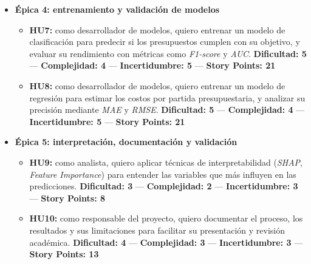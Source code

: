 \documentclass[
11pt, %
]{charter}
\begin{document}
\begin{itemize}
\begin{itemize}
      \item \textbf{HU6:} como científico de datos, quiero normalizar y codificar las variables categóricas y numéricas para que puedan ser interpretadas por los modelos.  
      \newline \textbf{Dificultad: 4} — \textbf{Complejidad: 3} — \textbf{Incertidumbre: 4} — \textbf{Story Points: 13}
    \end{itemize}

  \item \textbf{Épica 4: entrenamiento y validación de modelos}
    \begin{itemize}
      \item \textbf{HU7:} como desarrollador de modelos, quiero entrenar un modelo de clasificación para predecir si los presupuestos cumplen con su objetivo, y evaluar su rendimiento con métricas como \textit{F1-score} y \textit{AUC}.  
      \newline \textbf{Dificultad: 5} — \textbf{Complejidad: 4} — \textbf{Incertidumbre: 5} — \textbf{Story Points: 21}

      \item \textbf{HU8:} como desarrollador de modelos, quiero entrenar un modelo de regresión para estimar los costos por partida presupuestaria, y analizar su precisión mediante \textit{MAE} y \textit{RMSE}.  
      \newline \textbf{Dificultad: 5} — \textbf{Complejidad: 4} — \textbf{Incertidumbre: 5} — \textbf{Story Points: 21}
    \end{itemize}

  \item \textbf{Épica 5: interpretación, documentación y validación}
    \begin{itemize}
      \item \textbf{HU9:} como analista, quiero aplicar técnicas de interpretabilidad (\textit{SHAP}, \textit{Feature Importance}) para entender las variables que más influyen en las predicciones.  
      \newline \textbf{Dificultad: 3} — \textbf{Complejidad: 2} — \textbf{Incertidumbre: 3} — \textbf{Story Points: 8}

      \item \textbf{HU10:} como responsable del proyecto, quiero documentar el proceso, los resultados y sus limitaciones para facilitar su presentación y revisión académica.  
      \newline \textbf{Dificultad: 4} — \textbf{Complejidad: 3} — \textbf{Incertidumbre: 3} — \textbf{Story Points: 13}
    \end{itemize}


\end{itemize}
\end{document}
